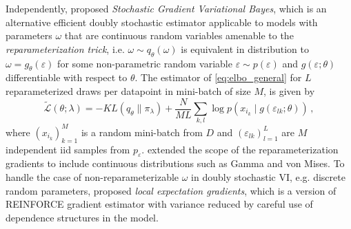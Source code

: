 \documentclass[a4paper,10pt,twocolumn]{article}
\begin{document}
Independently, \citet{kingma_auto-encoding_2014} proposed \emph{Stochastic Gradient
Variational Bayes}, which is an alternative efficient doubly stochastic estimator
applicable to models with parameters $\omega$ that are continuous random variables
amenable to the \emph{reparameterization trick}, i.e. $
  \omega \sim q_{\theta}(\omega)
$ is equivalent in distribution to $
  \omega = g_{\theta}(\varepsilon)
$ for some non-parametric random variable $
  \varepsilon \sim p(\varepsilon)
$ and $
  g(\varepsilon; \theta)
$ differentiable with respect to $\theta$. The estimator of \eqref{eq:elbo_general}
for $L$ reparameterized draws per datapoint in mini-batch of size $M$, is given by
\begin{equation}  \label{eq:sgvb_estimator}
  \widetilde{\mathcal{L}}(\theta; \lambda)
    = - KL(q_{\theta} \| \pi_{\lambda})
      + \frac{N}{M L} \sum_{k,l}
        \log p(x_{i_k} \mid g(\varepsilon_{lk}; \theta))
    \,,
\end{equation}
where $(x_{i_k})_{k=1}^M$ is a random mini-batch from $D$ and $
  (\varepsilon_{lk})_{l=1}^L
$ are $M$ independent iid samples from $p_\varepsilon$. \citet{figurnov_implicit_2019}
extended the scope of the reparameterization gradients to include continuous distributions
such as Gamma and von Mises. To handle the case of non-reparameterizable $\omega$ in
doubly stochastic VI, e.g. discrete random parameters, \citet{titsias_local_2015} proposed
\emph{local expectation gradients}, which is a version of REINFORCE gradient estimator
\citep{williams_simple_1992} with variance reduced by careful use of dependence
structures in the model.
\end{document}
